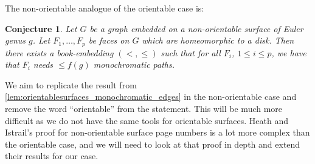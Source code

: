 \documentclass[]{report}
\newtheorem{conjecture}[theorem]{Conjecture}
\theoremstyle{definition}
\numberwithin{theorem}{section}
\numberwithin{equation}{section}
\begin{document}
The non-orientable analogue of the orientable case is:
\begin{conjecture}
	Let $G$ be a graph embedded on a non-orientable surface of Euler genus $g$. Let $F_1, \ldots, F_p$ be faces on $G$ which are homeomorphic to a disk. Then there exists a book-embedding $(<, \leq)$ such that for all $F_i$, $1 \leq i \leq p$, we have that $F_i$ needs $\leq f(g)$ monochromatic paths.
\end{conjecture}
We aim to replicate the result from \cref{lem:orientablesurfaces_monochromatic_edges} in the non-orientable case and remove the word ``orientable'' from the statement.
This will be much more difficult as we do not have the same tools for orientable surfaces. Heath and Istrail's proof for non-orientable surface page numbers is a lot more complex than the orientable case, and we will need to look at that proof in depth and extend their results for our case.

\printbibliography{}
\end{document}
